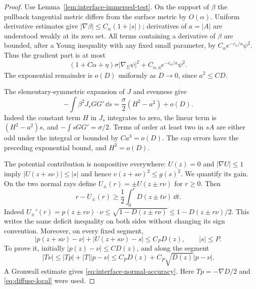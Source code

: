 \begin{proof}
Use Lemma~\ref{lem:interface-immersed-test}.  On the support of $\beta$
the pullback tangential metric differs from the surface metric by
$O(\alpha)$.  Uniform derivative estimates give
$|\nabla\beta|\le C_\alpha(1+|s|)$; derivatives of $a=|A|$ are
understood weakly at its zero set.  All terms containing a derivative
of $\beta$ are bounded, after a Young inequality with any fixed small
parameter, by $C_\alpha e^{-c_\alpha/a}\psi^2$.  Thus the gradient
part is at most
\[
 (1+C\alpha+\eta)\sigma|\nabla_\Sigma\psi|^2
       +C_{\alpha,\eta}e^{-c_\alpha/a}\psi^2.
\]
The exponential remainder is $o(D)$ uniformly as $D\to0$, since
$a^2\le CD$.

The elementary-symmetric expansion of $J$ and evenness give
\[
 -\int\beta^2J_sGG'\,\dd s
   =\frac\sigma2(H^2-a^2)+o(D).
\]
Indeed the constant term $H$ in $J_s$ integrates to zero,
the linear term is $(H^2-a^2)s$, and
$-\int sGG'=\sigma/2$.  Terms of order at least two in $sA$
are either odd under the integral or bounded by $Ca^3=o(D)$.
The cap errors have the preceding exponential bound, and $H^2=o(D)$.

The potential contribution is nonpositive everywhere: $U(z)=0$
and $|\nabla U|\le1$ imply $|U(z+s\nu)|\le|s|$ and hence
$v(z+s\nu)^2\le g(s)^2$.  We quantify its gain.
On the two normal rays define
$U_\pm(r)=\pm U(z\pm r\nu)$ for $r\ge0$.  Then
\[
 r-U_\pm(r)\ge\frac12\int_0^rD(z\pm t\nu)\,\dd t.
\]
Indeed $U_\pm'(r)=p(z\pm r\nu)\cdot\nu
\le\sqrt{1-D(z\pm r\nu)}\le1-D(z\pm r\nu)/2$.
This writes the same deficit inequality on both sides without changing
its sign convention.
Moreover, on every fixed segment,
\begin{equation}\label{eq:interface-normal-accuracy}
 |p(z+s\nu)-\nu|+|U(z+s\nu)-s|\le C_P D(z),\qquad |s|\le P.
\end{equation}
To prove it, initially $|p(z)-\nu|\le CD(z)$, and along the segment
\[
 |T\nu|\le|Tp|+|T||p-\nu|
       \le C_P D(z)+C_P\sqrt{D(z)}|p-\nu|.
\]
A Gronwall estimate gives \eqref{eq:interface-normal-accuracy}.
Here $Tp=-\nabla D/2$ and \eqref{eq:diffuse-local} were used.


\end{proof}
